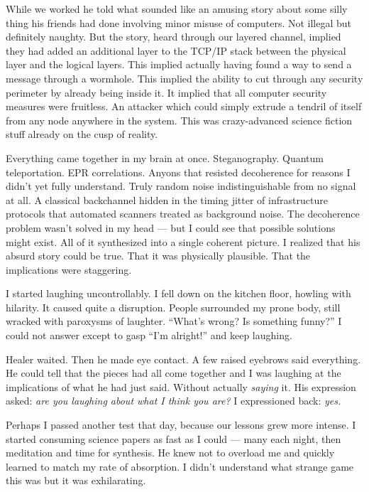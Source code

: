 While we worked he told what sounded like an amusing story about some silly thing his friends had done involving minor misuse of computers. Not illegal but definitely naughty. But the story, heard through our layered channel, implied they had added an additional layer to the TCP/IP stack between the physical layer and the logical layers. This implied actually having found a way to send a message through a wormhole. This implied the ability to cut through any security perimeter by already being inside it. It implied that all computer security measures were fruitless. An attacker which could simply extrude a tendril of itself from any node anywhere in the system. This was crazy-advanced science fiction stuff already on the cusp of reality.

Everything came together in my brain at once. Steganography. Quantum teleportation. EPR correlations. Anyons that resisted decoherence for reasons I didn't yet fully understand. Truly random noise indistinguishable from no signal at all. A classical backchannel hidden in the timing jitter of infrastructure protocols that automated scanners treated as background noise. The decoherence problem wasn't solved in my head --- but I could see that possible solutions might exist. All of it synthesized into a single coherent picture. I realized that his absurd story could be true. That it was physically plausible. That the implications were staggering.

I started laughing uncontrollably. I fell down on the kitchen floor, howling with hilarity. It caused quite a disruption. People surrounded my prone body, still wracked with paroxysms of laughter. ``What's wrong? Is something funny?'' I could not answer except to gasp ``I'm alright!'' and keep laughing.

Healer waited. Then he made eye contact. A few raised eyebrows said everything. He could tell that the pieces had all come together and I was laughing at the implications of what he had just said. Without actually \textit{saying} it. His expression asked: \textit{are you laughing about what I think you are?} I expressioned back: \textit{yes.}

Perhaps I passed another test that day, because our lessons grew more intense. I started consuming science papers as fast as I could --- many each night, then meditation and time for synthesis. He knew not to overload me and quickly learned to match my rate of absorption. I didn't understand what strange game this was but it was exhilarating.

